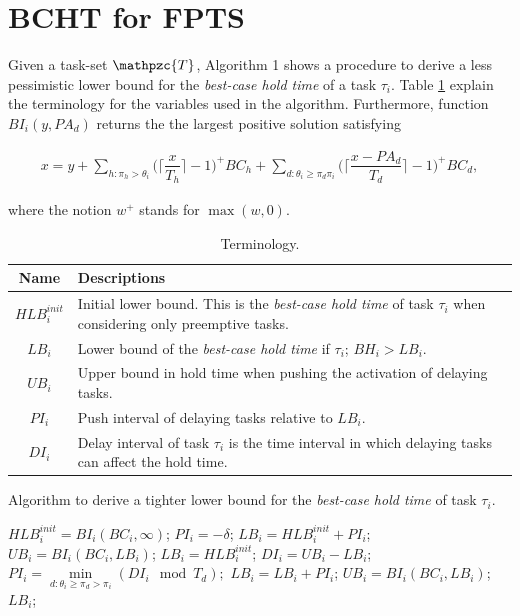 \documentclass[fleqn]{article}
\begin{document}
\section{BCHT for FPTS}

Given a task-set $\mathpzc{T}$, Algorithm 1 shows a procedure to derive a less pessimistic lower bound for the \textit{best-case hold time} of a task $\tau_i$. Table \ref{tab:terminology} explain the terminology for the variables used in the algorithm. Furthermore, function $BI_i(y,PA_d)$ returns the the largest positive solution satisfying

\begin{align}
x = y + \sum\limits_{h:\pi_h > \theta_i} \Big( \Big\lceil  \dfrac{x}{T_h}\Big\rceil -1 \Big)^+  BC_h + \sum\limits_{d:\theta_i \geq \pi_d \pi_i} \Big( \Big\lceil  \dfrac{x-PA_d}{T_d}\Big\rceil -1 \Big)^+  BC_d,
\end{align}

\noindent
where the notion $w^+$ stands for $\max(w,0)$.

\begin{table}[H]
	\center
	\caption{Terminology.}
	\label{tab:terminology}
	\begin{tabular}{|c | p{9cm}|}
		\hline
		Name & Descriptions \\ 
		\hline 
		\hline
		$HLB^{init}_i$& Initial lower bound. This is the \textit{best-case hold time} of task $\tau_i$ when considering only preemptive tasks.\\
		\hline
		$LB_i$& Lower bound of the \textit{best-case hold time} if $\tau_i$; $BH_i > LB_i.$\\
		\hline
		$UB_i$& Upper bound in hold time when pushing the activation of delaying tasks. \\ 
		\hline
		$PI_i$ & Push interval of delaying tasks relative to $LB_i$.   \\ 
		\hline
		$DI_i$ & Delay interval of task $\tau_i$ is the time interval in which delaying tasks can affect the hold time.\\
		\hline 
	\end{tabular}
\end{table} 

\begin{algorithm}[H]
	\caption{Algorithm to derive a tighter lower bound for the \textit{best-case hold time} of task $\tau_i$.}\label{euclid}
	\begin{algorithmic}[1]
		\State $HLB^{init}_i = BI_i(BC_i,\infty)$;
		\State $PI_i = -\delta$;
		\State $LB_i = HLB^{init}_i + PI_i$;
		\State $UB_i = BI_i(BC_i,LB_i)$;
		\State $LB_i = HLB^{init}_i$;
		\State $DI_i = UB_i - LB_i$;
		\State $PI_i = \min \limits_{d:\theta_i \geq \pi_d > \pi_i} (DI_i \mod T_d);$
		\State $LB_i = LB_i + PI_i$;
		\State $UB_i = BI_i(BC_i,LB_i)$;
		\State \Return $LB_i$; 
		\EndProcedure
	\end{algorithmic}
\end{algorithm}
\end{document}
